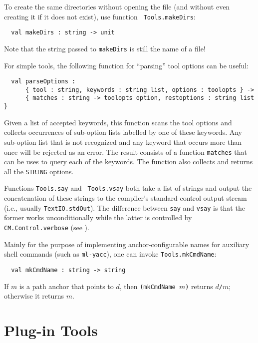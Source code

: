 To create the same directories without opening the file (and without
even creating it if it does not exist), use function {\tt
Tools.makeDirs}:

\begin{lstlisting}
  val makeDirs : string -> unit
\end{lstlisting}%

Note that the string passed to {\tt makeDirs} is still the name of a
file!

  For simple tools, the following
function for ``parsing'' tool options can be useful:

\begin{lstlisting}
  val parseOptions :
      { tool : string, keywords : string list, options : toolopts } ->
      { matches : string -> toolopts option, restoptions : string list }
\end{lstlisting}%

Given a list of accepted keywords, this function scans the tool
options and collects occurrences of sub-option lists labelled by one
of these keywords.  Any sub-option list that is not recognized and any
keyword that occurs more than once will be rejected as an error.  The
result consists of a function {\tt matches} that can be uses to query
each of the keywords.  The function also collects and returns all the
{\tt STRING} options.

 Functions {\tt Tools.say} and {\tt
Tools.vsay} both take a list of strings and output the concatenation
of these strings to the compiler's standard control output stream
(i.e., usually {\tt TextIO.stdOut}).  The difference between {\tt say}
and {\tt vsay} is that the former works unconditionally while the
latter is controlled by {\tt CM.Control.verbose} (see
).

 Mainly for the purpose of
implementing anchor-configurable names for auxiliary shell commands
(such as {\tt ml-yacc}), one can invoke {\tt Tools.mkCmdName}:

\begin{lstlisting}
  val mkCmdName : string -> string
\end{lstlisting}%

If $m$ is a path anchor that points to $d$, then {\tt (mkCmdName $m$)}
returns $d${\tt /}$m$; otherwise it returns $m$.

\section{Plug-in Tools}
\label{sec:plugintools}


